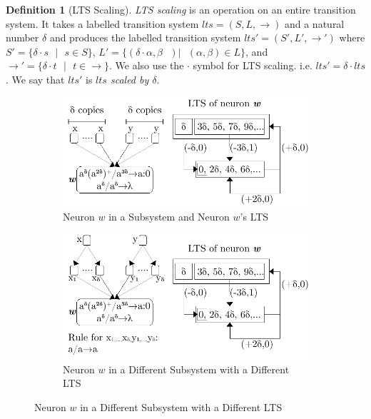 \documentclass[runningheads,a4paper]{llncs}
\theoremstyle{definition}
\newtheorem{definition2}{Definition}
\newcommand{\ra}{\rightarrow}
\newcommand{\se}{\text{ }}
\begin{document}
\begin{definition2}[LTS Scaling]
\emph{LTS scaling} is an operation on an entire transition system. It takes a labelled transition 
system $lts=(S,L,\ra)$ and a natural number $\delta$ and produces the labelled transition
system $lts'=(S',L',\ra')$ where $S' = \{\delta \cdot s\se|\se s\in S\}$, $L'=\{(\delta\cdot\alpha,
\beta\se)|\se (\alpha,\beta)\in L\}$, and $\ra' = \{\delta\cdot t\se|\se t \in \ra\}$. We also 
use the $\cdot$ symbol for LTS scaling. i.e. $lts'=\delta\cdot lts$. We say that $lts'$ is 
\emph{$lts$ scaled by $\delta$}.
\end{definition2}


\begin{figure}[h]
   \centering
   \caption{Neurons with Same Rule Set but Different LTSs}
   \begin{subfigure}{\textwidth}
      \centering
      \includegraphics[scale=0.65]{fig-lts-4a.pdf}
      \caption{Neuron $w$ in a Subsystem and Neuron $w$'s LTS}
      \label{fig-lts-4a}
   \end{subfigure}
   \begin{subfigure}{\textwidth}
      \centering
      \includegraphics[scale=0.65]{fig-lts-4b.pdf}
      \caption{Neuron $w$ in a Different Subsystem with a Different LTS}
      \label{fig-lts-4b}
   \end{subfigure}
   \label{fig-lts-4}
\end{figure}
\end{document}
